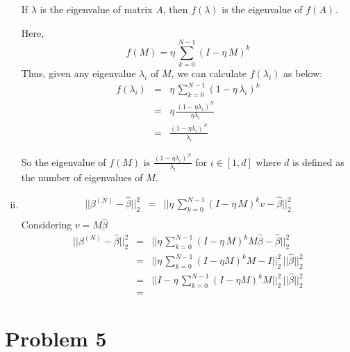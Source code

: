 \documentclass[twoside,11pt]{homework}
\begin{document}
\begin{enumerate}[(i)]
    If $\lambda$ is the eigenvalue of matrix $A$, then $f(\lambda)$ is the eigenvalue of $f(A)$. 
    
    Here, 
    $$f(M) = \eta\,\sum_{k=0}^{N-1} (I-\eta\,M)^k$$
    Thus, given any eigenvalue $\lambda_{i}$ of $M$, we can calculate $f(\lambda_{i})$ as below:
    \begin{eqnarray*}
f(\lambda_{i})
&=& \eta\,\sum_{k=0}^{N-1} (1-\eta\,\lambda_{i})^k \\
&=&  \eta\, \frac{(1-\eta\lambda_{i})^N}{\eta\lambda_{i}} \\
&=&  \frac{(1-\eta\lambda_{i})^N}{\lambda_{i}}
\end{eqnarray*}

So the eigenvalue of $f(M)$ is $\frac{(1-\eta\lambda_{i})^N}{\lambda_{i}}$ for $i\in [1,d]$ where $d$ is defined as the number of eigenvalues of $M$.

\item 

\begin{eqnarray*}
||\beta^{(N)}-\hat{\beta}||^2_{2}
&=& ||\eta\,\sum_{k=0}^{N-1} (I-\eta\,M)^kv-\hat{\beta}||^2_{2} \\
\end{eqnarray*}
Considering $v = M\hat{\beta}$
\begin{eqnarray*}
||\beta^{(N)}-\hat{\beta}||^2_{2}
&=& ||\eta\,\sum_{k=0}^{N-1} (I-\eta\,M)^kM\hat{\beta}-\hat{\beta}||^2_{2} \\
&=& ||\eta\,\sum_{k=0}^{N-1} (I-\eta M)^kM-I||^2_{2}\,||\hat{\beta}||^2_{2} \\
&=& ||I-\eta\,\sum_{k=0}^{N-1} (I-\eta M)^kM||^2_{2}\,||\hat{\beta}||^2_{2} \\
&=& 
\end{eqnarray*}

\end{enumerate}



\section*{Problem 5}
\end{document}
